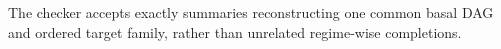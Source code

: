 The checker accepts exactly summaries reconstructing one common basal DAG and ordered target family, rather than unrelated regime-wise completions.